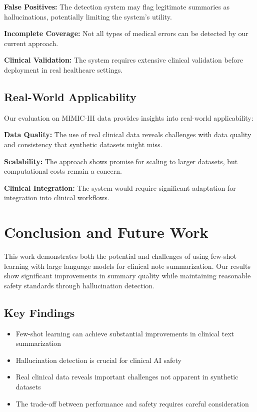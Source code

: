 \documentclass[sigconf]{acmart}
\begin{document}
\textbf{False Positives:} The detection system may flag legitimate summaries as hallucinations, potentially limiting the system's utility.

\textbf{Incomplete Coverage:} Not all types of medical errors can be detected by our current approach.

\textbf{Clinical Validation:} The system requires extensive clinical validation before deployment in real healthcare settings.

\subsection{Real-World Applicability}
Our evaluation on MIMIC-III data provides insights into real-world applicability:

\textbf{Data Quality:} The use of real clinical data reveals challenges with data quality and consistency that synthetic datasets might miss.

\textbf{Scalability:} The approach shows promise for scaling to larger datasets, but computational costs remain a concern.

\textbf{Clinical Integration:} The system would require significant adaptation for integration into clinical workflows.

\section{Conclusion and Future Work}
\label{sec:conclusion}

This work demonstrates both the potential and challenges of using few-shot learning with large language models for clinical note summarization. Our results show significant improvements in summary quality while maintaining reasonable safety standards through hallucination detection.

\subsection{Key Findings}
\begin{itemize}
    \item Few-shot learning can achieve substantial improvements in clinical text summarization
    \item Hallucination detection is crucial for clinical AI safety
    \item Real clinical data reveals important challenges not apparent in synthetic datasets
    \item The trade-off between performance and safety requires careful consideration
\end{itemize}
\end{document}
